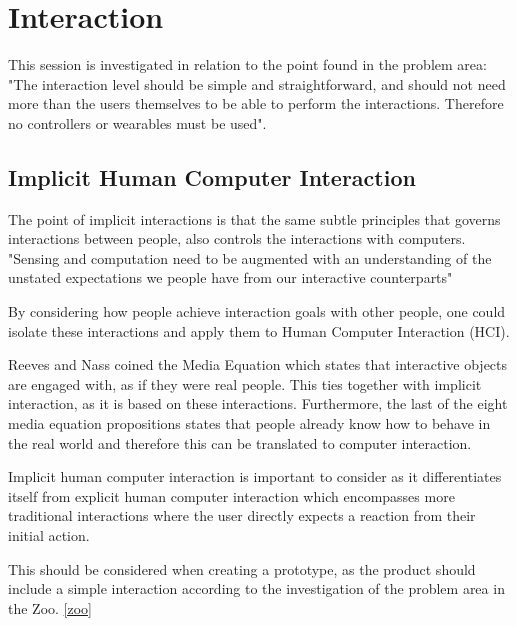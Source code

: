 \section{Interaction}
This session is investigated in relation to the point found in the problem area: "The interaction level should be simple and straightforward, and should not need more than the users themselves to be able to perform the interactions. Therefore no controllers or wearables must be used".

\subsection{Implicit Human Computer Interaction}
The point of implicit interactions is that the same subtle principles that governs interactions between people, also controls the interactions with computers\cite{Schmidt2000}.\\
"Sensing and computation need to be augmented with an understanding of the unstated expectations we people have from our interactive counterparts"\cite{Schmidt2000}

By considering how people achieve interaction goals with other people, one could isolate these interactions and apply them to Human Computer Interaction (HCI).

Reeves and Nass coined the Media Equation\cite{mediaequation} which states that interactive objects are engaged with, as if they were real people. This ties together with implicit interaction, as it is based on these interactions. Furthermore, the last of the eight media equation propositions states that people already know how to behave in the real world and therefore this can be translated to computer interaction.

Implicit human computer interaction is important to consider as it differentiates itself from explicit human computer interaction which encompasses more traditional interactions where the user directly expects a reaction from their initial action.

This should be considered when creating a prototype, as the product should include a simple interaction according to the investigation of the problem area in the Zoo. \ref{zoo}


